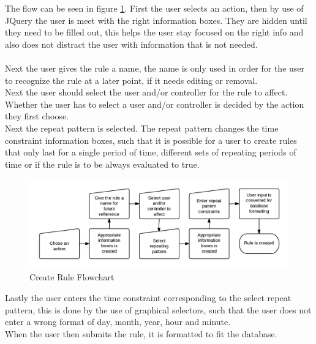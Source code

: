 The flow can be seen in figure \ref{fig:CreateRuleFlowchart}. First the user selects an action, then by use of JQuery the user is meet with the right information boxes. They are hidden until they need to be filled out, this helps the user stay focused on the right info and also does not distract the user with information that is not needed.\\
\\
Next the user gives the rule a name, the name is only used in order for the user to recognize the rule at a later point, if it needs editing or removal.\\
Next the user should select the user and/or controller for the rule to affect. Whether the user has to select a user and/or controller is decided by the action they first choose.\\
Next the repeat pattern is selected. The repeat pattern changes the time constraint information boxes, such that it is possible for a user to create rules that only last for a single period of time, different sets of repeating periods of time or if the rule is to be always evaluated to true.\\

\begin{figure}[htbp]
	\centering
		\includegraphics[width=1.50\textwidth, angle=90]{images/CreateRuleFlowchart.png}
	\caption{Create Rule Flowchart}
	\label{fig:CreateRuleFlowchart}
\end{figure}

Lastly the user enters the time constraint corresponding to the select repeat pattern, this is done by the use of graphical selectors, such that the user does not enter a wrong format of day, month, year, hour and minute.\\
When the user then submits the rule, it is formatted to fit the database. 